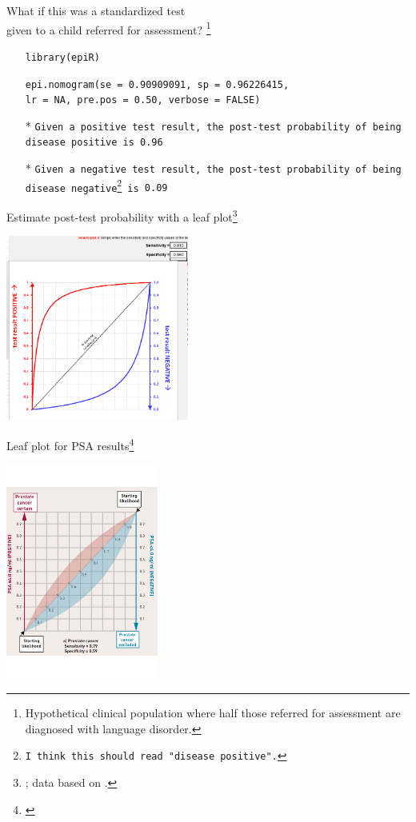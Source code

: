 \documentclass{beamer}
\begin{document}
% 
\begin{frame}{What if this was a standardized test \\ given to a child referred for assessment? \footnote{\tiny{Hypothetical clinical population where half those referred for assessment are diagnosed with language disorder.}}}
	\begin{itemize}
	\item[] \texttt{library(epiR)}
	\item[] \texttt{epi.nomogram(se = 0.90909091, sp = 0.96226415, \\ lr = NA, pre.pos = \alert{0.50}, verbose = FALSE)}
	\item[]
	\item[*] \texttt{Given a positive test result, the post-test probability of being disease positive is \alert{0.96}} 
	\item[*] \texttt{Given a negative test result, the post-test probability of being disease negative\footnote{\tiny{I think this should read "disease positive".}} is \alert{0.09}} 
	\end{itemize}
\end{frame}

%
\begin{frame}{Estimate post-test probability with a leaf plot\footnote{\tiny{\citet{Coulthard2019}; data based on \citet{Klee2000}.}}}
	\begin{center}
		\includegraphics[width =6cm]{images/leafplot_kleedata.png}
	\end{center}
\end{frame}

%
\begin{frame}{Leaf plot for PSA results\footnote{\tiny{\citet{Coulthard2019}}}}
	\begin{center}
		\includegraphics[width = 5cm]{images/leafplot_psa.pdf}
	\end{center}
\end{frame}
\end{document}
